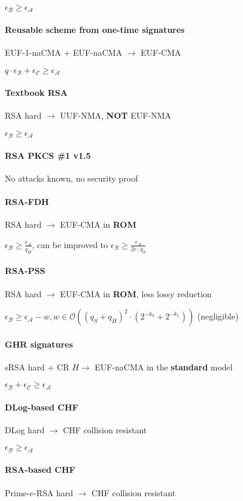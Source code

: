 \documentclass[oneside]{book}
\newcommand{\cA}[0]{\mathcal{A}}
\newcommand{\cB}[0]{\mathcal{B}}
\newcommand{\cC}[0]{\mathcal{C}}
\newcommand{\cO}[0]{\mathcal{O}}
\newcommand{\epsA}[0]{\epsilon_\cA}
\newcommand{\epsB}[0]{\epsilon_\cB}
\newcommand{\epsC}[0]{\epsilon_\cC}
\begin{document}
$\epsB \ge \epsA$

\paragraph{Reusable scheme from one-time signatures}
EUF-1-naCMA + EUF-naCMA $\rightarrow$ EUF-CMA

$q \cdot \epsB + \epsC \ge \epsA$

\paragraph{Textbook RSA}
RSA hard $\rightarrow$ UUF-NMA, \textbf{NOT} EUF-NMA

$\epsB \ge \epsA$

\paragraph{RSA PKCS \#1 v1.5}
No attacks known, no security proof

\paragraph{RSA-FDH}
RSA hard $\rightarrow$ EUF-CMA in \textbf{ROM}

$\epsB \ge \frac{\epsA}{q_H}$, can be improved to $\epsB \ge \frac{\epsA}{2e\cdot q_S}$

\paragraph{RSA-PSS}
RSA hard $\rightarrow$ EUF-CMA in \textbf{ROM}, less lossy reduction

$\epsB \ge \epsA - w, w \in \cO((q_S + q_H)^2 \cdot (2^{-k_0} + 2^{-k_1}))$ (negligible)

\paragraph{GHR signatures}
sRSA hard + CR $H \rightarrow$ EUF-naCMA in the \textbf{standard} model

$\epsB + \epsC \ge \epsA$

\paragraph{DLog-based CHF}
DLog hard $\rightarrow$ CHF collision resistant

$\epsB \ge \epsA$

\paragraph{RSA-based CHF}
Prime-$e$-RSA hard $\rightarrow$ CHF collision resistant
\end{document}
